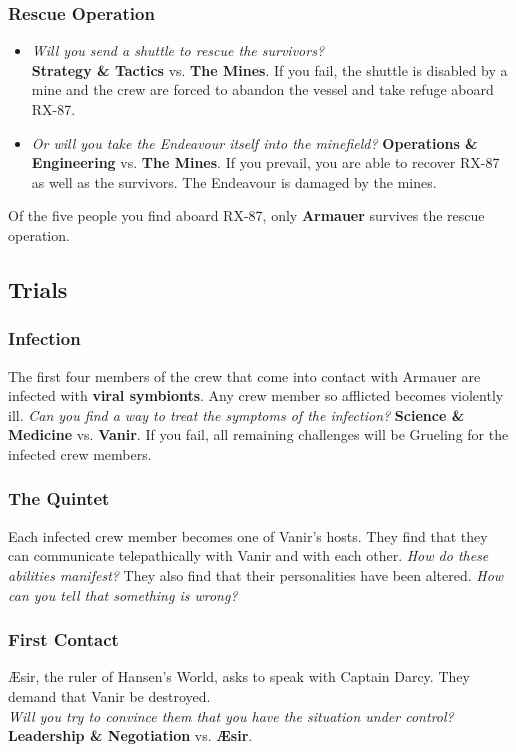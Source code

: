 \documentclass[11pt, a5paper, parskip=half-, DIV=12]{scrartcl}
\begin{document}
\subsubsection*{Rescue Operation}
\begin{itemize}
	\item \textit{Will you send a shuttle to rescue the survivors?} \\ \textbf{Strategy \& Tactics} vs. \textbf{The Mines}. If you fail, the shuttle is disabled by a mine and the crew are forced to abandon the vessel and take refuge aboard RX-87.
	\item \textit{Or will you take the Endeavour itself into the minefield?} \textbf{Operations \& Engineering} vs. \textbf{The Mines}. If you prevail, you are able to recover RX-87 as well as the survivors. The Endeavour is damaged by the mines.  
\end{itemize}

Of the five people you find aboard RX-87, only \textbf{Armauer} survives the rescue operation.

\newpage

\subsection*{Trials}
\subsubsection*{Infection}
The first four members of the crew that come into contact with Armauer are infected with \textbf{viral symbionts}. Any crew member so afflicted becomes violently ill. \textit{Can you find a way to treat the symptoms of the infection?} \textbf{Science \& Medicine} vs. \textbf{Vanir}. If you fail, all remaining challenges will be Grueling for the infected crew members.

\subsubsection*{The Quintet}
Each infected crew member becomes one of Vanir's hosts. They find that they can communicate telepathically with Vanir and with each other. \textit{How do these abilities manifest?} They also find that their personalities have been altered. \textit{How can you tell that something is wrong?}

\subsubsection*{First Contact}
\AE{}sir, the ruler of Hansen's World, asks to speak with Captain Darcy. They demand that Vanir be destroyed. \\ \textit{Will you try to convince them that you have the situation under control?} \textbf{Leadership \& Negotiation} vs. \textbf{\AE{}sir}.
\end{document}
